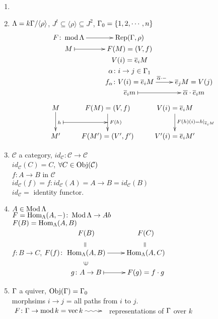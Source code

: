 
\begin{exam}
\begin{enumerate}
\item[]
\item $\Lambda = k\Gamma/\langle\rho \rangle$, $J^t \subseteq \langle \rho \rangle \subseteq J^2$, $\Gamma_0 = \{ 1, 2, \cdots, n \}$
\[\xymatrix@R-2pc{
F\colon  \mod\Lambda \ar[r] & \Rep(\G, \rho)\\
M \ar@{|->}[r] & F(M) = (V,f)\\
& V(i) = \overline{e}_iM\\
& \alpha\colon  i \to j \in \G_1\\
& f_\alpha \colon  V(i)= \overline{e}_iM \ar[r]^{\overline{\alpha} \cdot -} & \overline{e}_j M= V(j)\\
& \overline{e}_i m \ar@{|->}[r] & \overline{\alpha}\cdot\overline{e}_i m
}\]
\[\xymatrix{
M \ar[d]^h="h" & F(M)=(V,f) \ar[d]^{F(h)}="F(h)" \ar@{|->}"h";"F(h)" & V(i) =  \overline{e}_i M \ar[d]^{F(h)(i) = h\mid_{\overline{e}_i M}}\\
M' & F(M') = (V', f') & V'(i) = \overline{e}_i M'
}\]

\item $\mathcal{C}$ a category, $id_\mathcal{C}\colon  \mathcal{C} \to \mathcal{C}$\\
$id_\mathcal{C}(C) = C$, $\forall C \in \operatorname{Obj}(\mathcal{C})$\\
$f\colon A \to B$ in $\mathcal{C}$\\
$id_\mathcal{C}(f) = f\colon  id_\mathcal{C}(A) = A \to B = id_\mathcal{C}(B)$\\
$id_\mathcal{C} =$ identity functor.

\item $A \in \operatorname{Mod} \Lambda$\\
$F = \operatorname{Hom}_\Lambda(A, -)\colon  \operatorname{Mod}\Lambda \to Ab$\\
$F(B) =  \operatorname{Hom}_\Lambda(A, B)$\\
$f\colon  B \to C$, $F(f)\colon  \vcenter{\xymatrix@R-1pc{
F(B) \ar@{}[d]|-*[@]{=} & F(C) \ar@{}[d]|-*[@]{=}\\
\Hom_\Lambda(A,B) \ar@{}[d]|-*[@]{\ni} \ar[r] & \Hom_\Lambda(A, C)\\
g\colon  A\to B \ar@{|->}[r] & F(g) = f\cdot g
}}$

\item $\Gamma$ a quiver, $\operatorname{Obj}(\Gamma) = \Gamma_0$\\
morphsims $i\to j$ = all paths from $i$ to $j$.\\
$\xymatrix{F\colon  \G \to \mod k = \vec k \ar@{~>}[r]&}$ representations of $\Gamma$ over $k$
\end{enumerate}
\end{exam}

